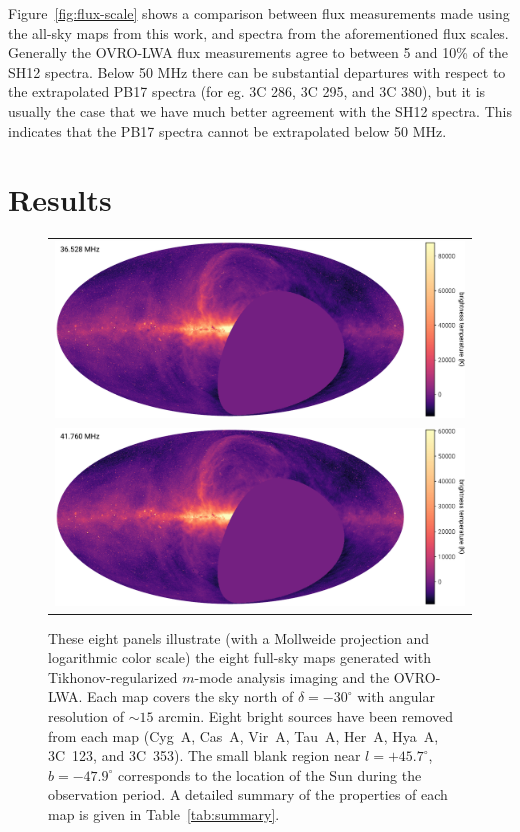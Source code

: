 \documentclass[twocolumn]{aastex61}
\begin{document}
Figure~\ref{fig:flux-scale} shows a comparison between flux measurements made using the all-sky maps
from this work, and spectra from the aforementioned flux scales. Generally the OVRO-LWA flux
measurements agree to between 5 and 10\% of the SH12 spectra. Below 50 MHz there can be substantial
departures with respect to the extrapolated PB17 spectra (for eg.  3C 286, 3C 295, and 3C 380), but
it is usually the case that we have much better agreement with the SH12 spectra. This indicates that
the PB17 spectra cannot be extrapolated below 50 MHz.

\section{Results}\label{sec:results}

\begin{figure}[ht]
    \centering
    \begin{tabular}{c}
        \includegraphics[height=0.32\textheight]{figures/channel-maps/spw04} \\
        \includegraphics[height=0.32\textheight]{figures/channel-maps/spw06} \\
    \end{tabular}
    \caption{
        These eight panels illustrate (with a Mollweide projection and logarithmic color scale) the
        eight full-sky maps generated with Tikhonov-regularized $m$-mode analysis imaging and the
        OVRO-LWA.  Each map covers the sky north of $\delta=-30^\circ$ with angular resolution of
        $\sim15$ arcmin. Eight bright sources have been removed from each map (Cyg~A, Cas~A, Vir~A,
        Tau~A, Her~A, Hya~A, 3C~123, and 3C~353). The small blank region near $l=+45.7^\circ$,
        $b=-47.9^\circ$ corresponds to the location of the Sun during the observation period.  A
        detailed summary of the properties of each map is given in Table~\ref{tab:summary}.
    }
    \label{fig:channel-maps}
\end{figure}
\end{document}
